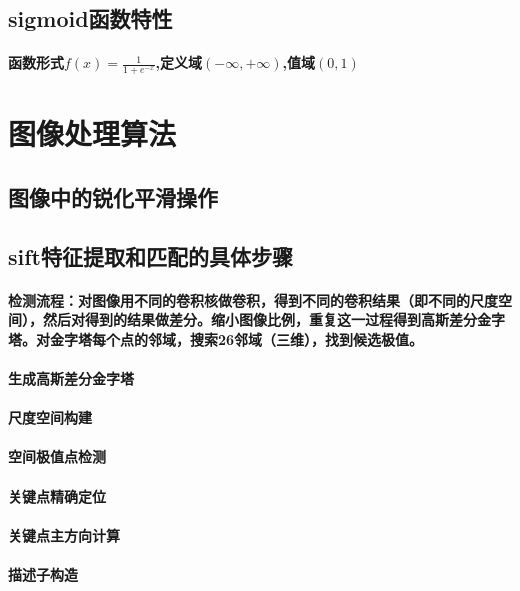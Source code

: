 \documentclass[UTF8]{ctexart}
\begin{document}
\subsection{sigmoid函数特性}
\paragraph{函数形式$f\left(x\right)=\frac{1}{1+{e}^{-x}}$,定义域$\left(-\infty,+\infty\right)$,值域$\left(0,1\right)$}


\section{图像处理算法}
\subsection{图像中的锐化平滑操作}
\subsection{sift特征提取和匹配的具体步骤}
\paragraph{检测流程：对图像用不同的卷积核做卷积，得到不同的卷积结果（即不同的尺度空间），然后对得到的结果做差分。缩小图像比例，重复这一过程得到高斯差分金字塔。对金字塔每个点的邻域，搜索26邻域（三维），找到候选极值。}
\paragraph{生成高斯差分金字塔}
\paragraph{尺度空间构建}
\paragraph{空间极值点检测}
\paragraph{关键点精确定位}
\paragraph{关键点主方向计算}
\paragraph{描述子构造}
\end{document}
